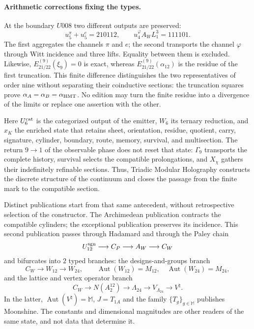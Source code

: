 \paragraph{Arithmetic corrections fixing the types.}
At the boundary \(U008\) two different outputs are preserved:
\[
 u_5^\pi+u_5^e=210112,
 \qquad
 u_4^\varphi A_WL_1^3=111101.
\]
The first aggregates the channels \(\pi\) and \(e\); the second transports the
channel \(\varphi\) through Witt incidence and three lifts. Equality
between them is excluded. Likewise,
\(E_{21/22}^{(9)}(\xi_9)=0\) is exact, whereas
\(E_{21/22}^{(9)}(\alpha_{12})\) is the residue of the first truncation. This
finite difference distinguishes the two representatives of order nine without separating
their coinductive sections: the truncation squares prove
\(\alpha_A=\alpha_B=\alpha_{\rm HMT}\). No edition may turn the
finite residue into a divergence of the limits or replace one assertion
with the other.

Here \(U_6^{\rm cat}\) is the categorized output of the emitter, \(W_6\) its
ternary reduction, and \(\widehat x_K\) the enriched state that retains sheet,
orientation, residue, quotient, carry, signature, cylinder, boundary, route,
memory, survival, and multisection. The return \(9\to1\) of the observable
phase does not reset that state:
\(\Gamma_9\) transports the complete history, survival selects the compatible
prolongations, and \(X_\chi\) gathers their indefinitely refinable
sections. Thus, Triadic Modular Holography constructs the
discrete structure of the continuum and closes the passage from the finite mark to the
compatible section.

Distinct publications start from that same antecedent, without retrospective
selection of the constructor. The Archimedean publication contracts the
compatible cylinders; the exceptional publication preserves its incidence.
This second publication passes through Hadamard and through the Paley chain
\[
 U_{12}^{\rm sgn}\longrightarrow C_P\longrightarrow A_W
 \longrightarrow C_W
\]
and bifurcates into \(2\) typed branches: the designs-and-groups branch
\[
 C_W\longrightarrow W_{12}\longrightarrow W_{24},
 \qquad
 \operatorname{Aut}(W_{12})=M_{12},\quad
 \operatorname{Aut}(W_{24})=M_{24},
\]
and the lattice and vertex operator branch
\[
 C_W\longrightarrow N(A_2^{12})\longrightarrow\Lambda_{24}
 \longrightarrow V_{\Lambda_{24}}\longrightarrow V^\natural .
\]
In the latter, \(\operatorname{Aut}(V^\natural)=\mathbb M\),
\(J=T_{1A}\) and the family \(\{T_g\}_{g\in\mathbb M}\) publishes Moonshine. The constants and
dimensional magnitudes are other readers of the same state, and not data
that determine it.

